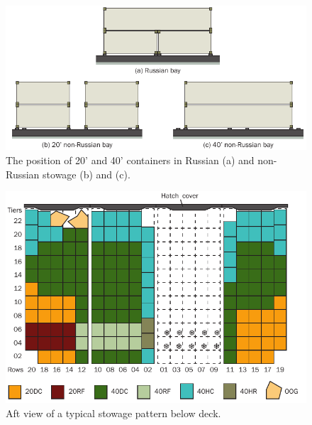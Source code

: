 \documentclass[runningheads]{llncs}
\begin{document}
\begin{figure}[h!]
  \centering
  \includegraphics{figures/3_36}
  \caption{The position of 20' and 40' containers in Russian (a) and non-Russian stowage (b) and (c).}\label{fig:OnDeckContainerPlacementInSockets}
\end{figure}

\begin{figure}[h!]
  \centering
  \includegraphics{figures/3_24}
  \caption{Aft view of a typical stowage pattern below deck.}\label{fig:BelowDeckPattern}
\end{figure}
\end{document}
